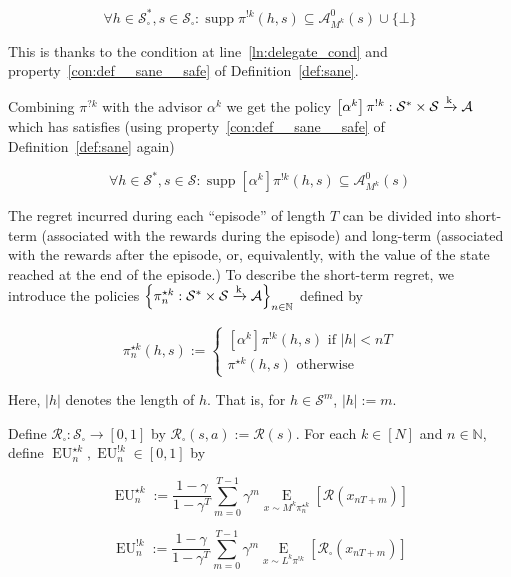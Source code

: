 \documentclass[anon,12pt]{colt2018} %
\DeclareMathOperator{\Supp}{supp}
\newcommand{\AP}[1]{\left(#1\right)}
\newcommand{\AB}[1]{\left[#1\right]}
\newcommand{\AC}[1]{\left\{#1\right\}}
\newcommand{\Ea}[2]{\underset{#1}{\operatorname{E}}\AB{#2}}
\newcommand{\Nats}{\mathbb{N}}
\newcommand{\Abs}[1]{\left\vert #1 \right\vert}
\newcommand{\K}{\xrightarrow{\textnormal{k}}}
\newcommand{\A}{\mathcal{A}}
\newcommand{\St}{\mathcal{S}}
\newcommand{\R}{\mathcal{R}}
\newcommand{\EU}{\operatorname{EU}}
\newcommand{\MP}[2]{#1#2}
\newcommand{\AdP}[2]{\AB{#1}#2}
\newcommand{\Ad}{\alpha}
\newcommand{\IP}{\pi^{!k}}
\begin{document}
\begin{equation}
\forall h\in\St_\square^*,s\in\St_\square: \Supp{\IP(h,s)} \subseteq \A_{M^k}^0(s)\cup\{\bot\}
\end{equation}

This is thanks to the condition at line~\ref{ln:delegate_cond} and property~\ref{con:def__sane__safe} of Definition~\ref{def:sane}.

Combining $\pi^{?k}$ with the advisor $\alpha^k$ we get the policy $\AdP{\Ad^k}{\IP}: \St^*\times\St\K\A$ which has satisfies (using property~\ref{con:def__sane__safe} of Definition~\ref{def:sane} again)

\begin{equation}
\label{eqn:imaginary_safety}
\forall h\in\St^*,s\in\St: \Supp{\AdP{\Ad^k}{\IP}(h,s)} \subseteq \A_{M^k}^0(s)
\end{equation}

The regret incurred during each \enquote{episode} of length $T$ can be divided into short-term (associated with the rewards during the episode) and long-term (associated with the rewards after the episode, or, equivalently, with the value of the state reached at the end of the episode.) To describe the short-term regret, we introduce the policies $\AC{\pi_n^{\star k}: \St^* \times \St \K \A}_{n \in \Nats}$ defined by

\begin{equation}
\pi_n^{\star k}(h,s):=\begin{cases} \AdP{\Ad^k}{\IP}(h,s) \text{ if } \Abs{h} < nT \\ \pi^{\star k}(h,s) \text{ otherwise} \end{cases}
\end{equation}

Here, $\Abs{h}$ denotes the length of $h$. That is, for $h \in \St^m$, $\Abs{h}:=m$.

Define $\R_\square: \St_\square \rightarrow [0,1]$ by $\R_\square(s,a):=\R(s)$. For each $k\in[N]$ and $n\in\Nats$, define $\EU_n^{\star k},\EU_n^{!k}\in[0,1]$ by

\begin{equation}
\EU_n^{\star k}:=\frac{1-\gamma}{1-\gamma^T}\sum_{m=0}^{T-1} \gamma^m \Ea{x\sim{\MP{M^k}{\pi_n^{\star  k}}}}{\R\AP{x_{nT+m}}}
\end{equation}

\begin{equation}
\EU_n^{!k}:=\frac{1-\gamma}{1-\gamma^T}\sum_{m=0}^{T-1} \gamma^m \Ea{x\sim{\MP{L^k}{\IP}}}{\R_\square\AP{x_{nT+m}}}
\end{equation}
\end{document}
